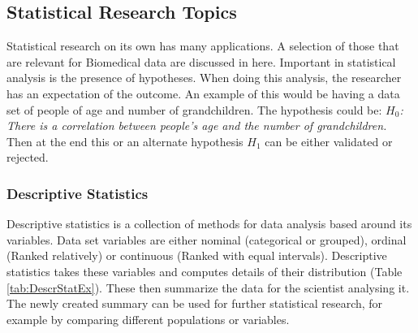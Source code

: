 \documentclass[10pt,a4paper]{article}
\begin{document}
	\clearpage
	
	\subsection{Statistical Research Topics}
	
	Statistical research on its own has many applications. A selection of those 
	that are relevant for Biomedical data are discussed in here. Important in 
	statistical analysis is the presence of hypotheses. When doing this 
	analysis, the researcher has an expectation of the outcome. An example of 
	this would be having a data set of people of age and number of 
	grandchildren. The hypothesis could be: \textit{$H_0$: There is a 
	correlation between people's age and the number of grandchildren.} Then at 
	the end this or an alternate hypothesis $H_1$ can be either validated or 
	rejected.\cite{heiberger2004statistical}
	
	\subsubsection{Descriptive Statistics}
	
	Descriptive statistics is a collection of methods for data analysis based around its variables. Data set variables are either nominal (categorical or grouped), ordinal (Ranked relatively) or continuous (Ranked with equal intervals). Descriptive statistics takes these variables and computes details of their distribution (Table \ref{tab:DescrStatEx}). \cite{FISHER200993} These then summarize the data for the scientist analysing it. The newly created summary can be used for further statistical research, for example by comparing different populations or variables. \cite{woolson2011statistical}
	
\end{document}
